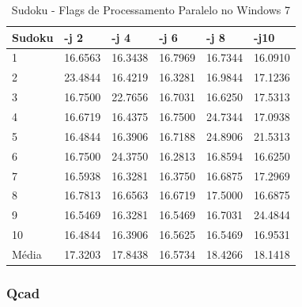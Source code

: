\begin{table}[!ht]
\centering
\tiny
\caption{Sudoku - Flags de Processamento Paralelo no Windows 7}
\label{tab:flag_processamento_paralelo:windows:sudoku}
\begin{tabular}{llllll}
\textbf{Sudoku} & \textbf{-j 2} & \textbf{-j 4} & \textbf{-j 6} & \textbf{-j 8} & \textbf{-j10}  \\ \toprule
1        & 16.6563 & 16.3438 & 16.7969 & 16.7344 & 16.0910  \\ 
2        & 23.4844 & 16.4219 & 16.3281 & 16.9844 & 17.1236  \\ 
3        & 16.7500 & 22.7656 & 16.7031 & 16.6250 & 17.5313  \\ 
4        & 16.6719 & 16.4375 & 16.7500 & 24.7344 & 17.0938  \\ 
5        & 16.4844 & 16.3906 & 16.7188 & 24.8906 & 21.5313  \\ 
6        & 16.7500 & 24.3750 & 16.2813 & 16.8594 & 16.6250  \\ 
7        & 16.5938 & 16.3281 & 16.3750 & 16.6875 & 17.2969  \\ 
8        & 16.7813 & 16.6563 & 16.6719 & 17.5000 & 16.6875  \\ 
9        & 16.5469 & 16.3281 & 16.5469 & 16.7031 & 24.4844  \\ 
10       & 16.4844 & 16.3906 & 16.5625 & 16.5469 & 16.9531  \\ \bottomrule
Média    & 17.3203 & 17.8438 & 16.5734 & 18.4266 & 18.1418  \\ 
\end{tabular}
\end{table}

\clearpage
\subsubsection*{Qcad}

